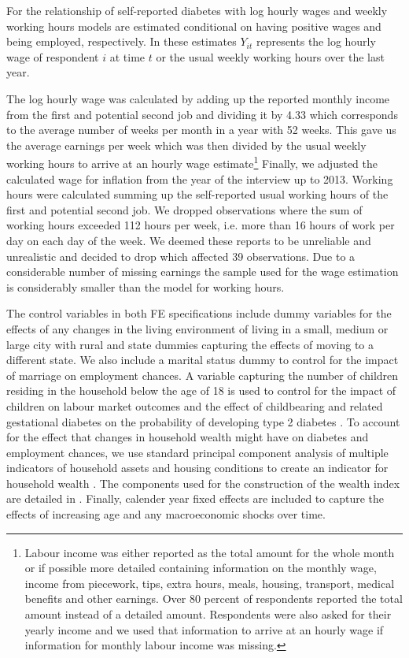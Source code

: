 \documentclass[12pt,english,british]{article}
\begin{document}
For the relationship of self-reported diabetes with log hourly wages
and weekly working hours models are estimated conditional on having positive wages and being
employed, respectively. In these estimates $Y_{it}$ represents the log hourly wage
of respondent $i$ at time $t$ or the usual weekly working hours
over the last year.

The log hourly wage was calculated by adding up the reported monthly
income from the first and potential second job and dividing it by
4.33 which corresponds to the average number of weeks per month in
a year with 52 weeks. This gave us the average earnings per week which
was then divided by the usual weekly working hours to arrive at an
hourly wage estimate\footnote{Labour income was either reported as the total amount for the whole
month or if possible more detailed containing information on the monthly
wage, income from piecework, tips, extra hours, meals, housing, transport,
medical benefits and other earnings. Over 80 percent of respondents
reported the total amount instead of a detailed amount. Respondents
were also asked for their yearly income and we used that information
to arrive at an hourly wage if information for monthly labour income
was missing.} Finally, we adjusted the calculated wage for inflation from the year
of the interview up to 2013. Working hours were calculated summing
up the self-reported usual working hours of the first and potential
second job. We dropped observations where the sum of working hours
exceeded 112 hours per week, i.e. more than 16 hours of work per day
on each day of the week. We deemed these reports to be unreliable
and unrealistic and decided to drop which affected 39 observations.
Due to a considerable number of missing earnings the sample used for the wage estimation is considerably smaller than the model for working hours.

The control variables in both \ac{FE} specifications include dummy variables for the effects of any changes in the living environment
of living in a small, medium or large city with rural and state
dummies capturing the effects of moving to a different state. We also include a marital
status dummy to control for the impact of marriage on employment chances.
A variable capturing the number of children residing in the household
below the age of 18 is used to control for the impact of children
on labour market outcomes and the effect of childbearing and related
gestational diabetes on the probability of developing type 2 diabetes
\citep{Bellamy2009}. To account for the effect that changes in household
wealth might have on diabetes and employment chances, we use standard
principal component analysis of multiple indicators of household assets
and housing conditions to create an indicator for household wealth
\citep{Filmer2001}. The components used for the construction of the
wealth index are detailed in \citet{Seuring2015}. Finally, calender year fixed effects are included to capture the effects of increasing age and any macroeconomic shocks over time.
\end{document}
